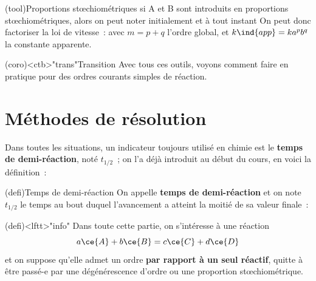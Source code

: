 \documentclass[../../main/main.tex]{subfiles}
\begin{document}
\begin{tcb*}(tool){Proportions stœchiométriques}
	\smallbreak
	\noindent
	si A et B sont introduits en proportions stœchiométriques, alors on peut
	noter initialement
	\psw{%
		\[
			\frac{n_0(\ce{A)})}{a} = \frac{n_0(\ce{B)})}{b}
			\quad \ste{\Longleftrightarrow}{\mdiv V} \quad
			[{\ce{A}}]_0 = ac_0
			\qet
			[{\ce{B}}]_0 = bc_0
		\]
	}
	et à tout instant
	\psw{%
		\[
			\boxed{
				[{\ce{A}}](t) = a (c_0 - x)
				\qet
				[{\ce{B}}](t) = b (c_0 - x)
			}%
		\]
	}
	On peut donc factoriser la loi de vitesse~:
	avec $m = p + q$ l'ordre global, et $k\ind{app} = ka^{p}b^{q}$ la constante
	apparente.
\end{tcb*}

\begin{tcn}(coro)<ctb>"trans"{Transition}
	Avec tous ces outils, voyons comment faire en pratique pour des ordres
	courants simples de réaction.
\end{tcn}

\section{Méthodes de résolution}

Dans toutes les situations, un indicateur toujours utilisé en chimie est le
\textbf{temps de demi-réaction}, noté $t_{1/2}$~; on l'a déjà introduit au début
du cours, en voici la définition~:

\begin{tcb*}[label=def:tundemi](defi){Temps de demi-réaction}
	On appelle \textbf{temps de demi-réaction} et on note $t_{1/2}$ le temps au
	bout duquel l'avancement a atteint la moitié de sa valeur finale~:
	\psw{%
		\[\boxed{\xi(t_{1/2}) = \frac{\xi_f}{2}}\]
	}%
	\vspace{-15pt}
\end{tcb*}

\begin{tcn}(defi)<lftt>"info"{}
	Dans toute cette partie, on s'intéresse à une réaction
	\[
		a{\ce{A}} + b{\ce{B}}
		=
		c{\ce{C}} +d{\ce{D}}
	\]
	et on suppose qu'elle admet un ordre \textbf{par rapport à un seul réactif},
	quitte à être passé-e par une dégénérescence d'ordre ou une proportion
	stœchiométrique.
\end{tcn}
\end{document}
